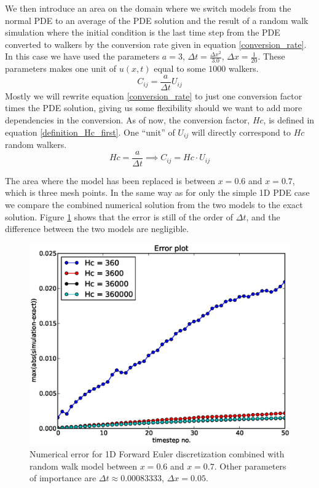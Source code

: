 We then introduce an area on the domain where we switch models from the normal PDE to an average of the PDE solution and the result of a random walk simulation where the initial condition is the last time step from the PDE converted to walkers by the conversion rate given in equation \ref{conversion_rate}. In this case we have used the parameters $a=3$, $\Delta t = \frac{\Delta x^2}{3.0}$, $\Delta x = \frac{1}{20}$. 
These parameters makes one unit of $u(x,t)$ equal to some $1000$ walkers. 
\begin{equation}\label{conversion_rate}
 C_{ij} = \frac{a}{\Delta t}U_{ij}
\end{equation}
Mostly we will rewrite equation \ref{conversion_rate} to just one conversion factor times the PDE solution, giving us some flexibility should we want to add more dependencies in the conversion. 
As of now, the conversion factor, $Hc$, is defined in equation \ref{definition_Hc_first}. 
One ``unit'' of $ U_{ij}$ will directly correspond to $Hc$ random walkers.
\begin{equation}\label{definition_Hc_first}
 Hc =  \frac{a}{\Delta t} \implies C_{ij} = Hc\cdot U_{ij}
\end{equation}

The area where the model has been replaced is between $x=0.6$ and $x=0.7$, which is three mesh points. 
In the same way as for only the simple 1D PDE case we compare the combined numerical solution from the two models to the exact solution. 
Figure \ref{errorplot_FE1D_Walk_first_attemt} shows that the error is still of the order of $\Delta t$, and the difference between the two models are negligible. 

\begin{figure}[H]
\centering
\includegraphics[scale=0.7]{../doc/results/experiment_31102013_1017/results/errorplot.eps}
\caption[Effect of increasing number of walkers]{Numerical error for 1D Forward Euler discretization combined with random walk model between $x=0.6$ and $x=0.7$. Other parameters of importance are $\Delta t\approx 0.00083333$, $\Delta x = 0.05$.}
\label{errorplot_FE1D_Walk_first_attemt}
\end{figure}

